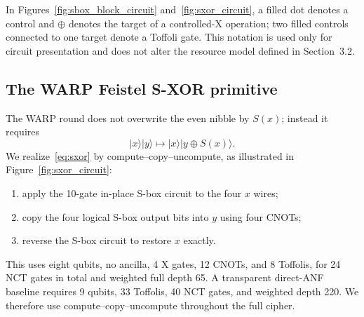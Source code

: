 \documentclass[pdflatex,sn-nature]{sn-jnl}
\providecommand{\ket}[1]{\lvert #1\rangle}
\theoremstyle{thmstyleone}
\theoremstyle{thmstyletwo}
\begin{document}
In Figures~\ref{fig:sbox_block_circuit} and~\ref{fig:sxor_circuit}, a filled dot denotes a control and $\oplus$ denotes the target of a controlled-X operation; two filled controls connected to one target denote a Toffoli gate. This notation is used only for circuit presentation and does not alter the resource model defined in Section~3.2.

\subsection{The WARP Feistel S-XOR primitive}
The WARP round does not overwrite the even nibble by $S(x)$; instead it requires
\begin{equation}
    \ket{x}\ket{y}\longmapsto \ket{x}\ket{y\oplus S(x)}.
    \label{eq:sxor}
\end{equation}
We realize~\eqref{eq:sxor} by compute--copy--uncompute, as illustrated in Figure~\ref{fig:sxor_circuit}:
\begin{enumerate}
    \item apply the 10-gate in-place S-box circuit to the four $x$ wires;
    \item copy the four logical S-box output bits into $y$ using four CNOTs;
    \item reverse the S-box circuit to restore $x$ exactly.
\end{enumerate}
This uses eight qubits, no ancilla, 4 X gates, 12 CNOTs, and 8 Toffolis, for 24 NCT gates in total and weighted full depth 65. A transparent direct-ANF baseline requires 9 qubits, 33 Toffolis, 40 NCT gates, and weighted depth 220. We therefore use compute--copy--uncompute throughout the full cipher.
\end{document}
